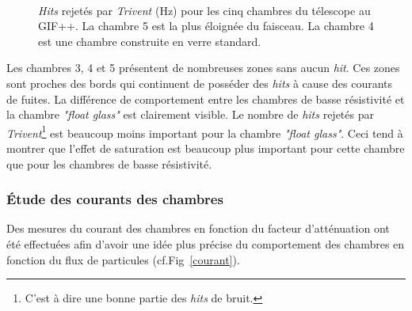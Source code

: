 \begin{figure}[ht!]
	\\
	\vspace{0.7cm}
	\caption{\textit{Hits} rejetés par \textit{Trivent} (\si{\hertz}) pour les cinq chambres du télescope au GIF++. La chambre \num{5} est la plus éloignée du faisceau. La chambre \num{4} est une chambre construite en verre standard.}
	\label{struc}
\end{figure}

Les chambres \num{3}, \num{4} et \num{5} présentent de nombreuses zones sans aucun \textit{hit}. Ces zones sont proches des bords qui continuent de posséder des \textit{hits} à cause des courants de fuites. La différence de comportement entre les chambres de basse résistivité et la chambre \textit{"float glass"} est clairement visible. Le nombre de \textit{hits} rejetés par \textit{Trivent}\footnote{C'est à dire une bonne partie des \textit{hits} de bruit.} est beaucoup moins important pour la chambre \textit{"float glass"}. Ceci tend à montrer que l'effet de saturation est beaucoup plus important pour cette chambre que pour les chambres de basse résistivité.

\subsubsection{Étude des courants des chambres}
Des mesures du courant des chambres en fonction du facteur d'atténuation ont été effectuées afin d'avoir une idée plus précise du comportement des chambres en fonction du flux de particules (cf.Fig~\ref{courant}).

